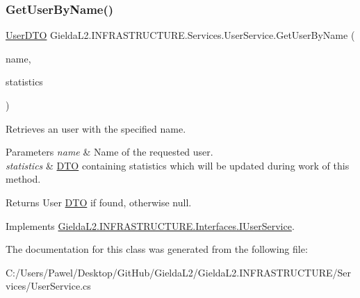 \subsubsection{\texorpdfstring{GetUserByName()}{GetUserByName()}}
{\footnotesize\ttfamily \mbox{\hyperlink{class_gielda_l2_1_1_i_n_f_r_a_s_t_r_u_c_t_u_r_e_1_1_d_t_o_1_1_user_d_t_o}{User\+D\+TO}} Gielda\+L2.\+I\+N\+F\+R\+A\+S\+T\+R\+U\+C\+T\+U\+R\+E.\+Services.\+User\+Service.\+Get\+User\+By\+Name (\begin{DoxyParamCaption}\item[{string}]{name,  }\item[{\mbox{\hyperlink{class_gielda_l2_1_1_i_n_f_r_a_s_t_r_u_c_t_u_r_e_1_1_d_t_o_1_1_statistics_d_t_o}{Statistics\+D\+TO}}}]{statistics }\end{DoxyParamCaption})}



Retrieves an user with the specified name. 


\begin{DoxyParams}{Parameters}
{\em name} & Name of the requested user.\\
\hline
{\em statistics} & \mbox{\hyperlink{namespace_gielda_l2_1_1_i_n_f_r_a_s_t_r_u_c_t_u_r_e_1_1_d_t_o}{D\+TO}} containing statistics which will be updated during work of this method.\\
\hline
\end{DoxyParams}
\begin{DoxyReturn}{Returns}
User \mbox{\hyperlink{namespace_gielda_l2_1_1_i_n_f_r_a_s_t_r_u_c_t_u_r_e_1_1_d_t_o}{D\+TO}} if found, otherwise null.
\end{DoxyReturn}


Implements \mbox{\hyperlink{interface_gielda_l2_1_1_i_n_f_r_a_s_t_r_u_c_t_u_r_e_1_1_interfaces_1_1_i_user_service_a438bd5d0424677c7797ce1ec00d132dc}{Gielda\+L2.\+I\+N\+F\+R\+A\+S\+T\+R\+U\+C\+T\+U\+R\+E.\+Interfaces.\+I\+User\+Service}}.



The documentation for this class was generated from the following file\+:\begin{DoxyCompactItemize}
\item 
C\+:/\+Users/\+Pawel/\+Desktop/\+Git\+Hub/\+Gielda\+L2/\+Gielda\+L2.\+I\+N\+F\+R\+A\+S\+T\+R\+U\+C\+T\+U\+R\+E/\+Services/User\+Service.\+cs\end{DoxyCompactItemize}
